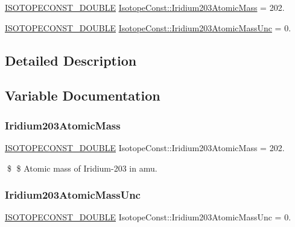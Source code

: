 \begin{DoxyCompactItemize}
\item 
\mbox{\hyperlink{group___isotope_const-_macros_ga8f45a7272ce02c0b4c65c44636ed719a}{I\+S\+O\+T\+O\+P\+E\+C\+O\+N\+S\+T\+\_\+\+D\+O\+U\+B\+LE}} \mbox{\hyperlink{group___isotope_const-_iridium-_ir203_gaf06bdb3d6808ec3d9e85cf89a5cb1a67}{Isotope\+Const\+::\+Iridium203\+Atomic\+Mass}} = 202.
\item 
\mbox{\hyperlink{group___isotope_const-_macros_ga8f45a7272ce02c0b4c65c44636ed719a}{I\+S\+O\+T\+O\+P\+E\+C\+O\+N\+S\+T\+\_\+\+D\+O\+U\+B\+LE}} \mbox{\hyperlink{group___isotope_const-_iridium-_ir203_ga0a6357fb4f5459d70a1bb34303ed77c2}{Isotope\+Const\+::\+Iridium203\+Atomic\+Mass\+Unc}} = 0.
\end{DoxyCompactItemize}


\subsection{Detailed Description}


\subsection{Variable Documentation}
\mbox{\label{group___isotope_const-_iridium-_ir203_gaf06bdb3d6808ec3d9e85cf89a5cb1a67}} 
\subsubsection{\texorpdfstring{Iridium203\+Atomic\+Mass}{Iridium203AtomicMass}}
{\footnotesize\ttfamily \mbox{\hyperlink{group___isotope_const-_macros_ga8f45a7272ce02c0b4c65c44636ed719a}{I\+S\+O\+T\+O\+P\+E\+C\+O\+N\+S\+T\+\_\+\+D\+O\+U\+B\+LE}} Isotope\+Const\+::\+Iridium203\+Atomic\+Mass = 202.}

\$ \$ Atomic mass of Iridium-\/203 in amu. \mbox{\label{group___isotope_const-_iridium-_ir203_ga0a6357fb4f5459d70a1bb34303ed77c2}} 
\subsubsection{\texorpdfstring{Iridium203\+Atomic\+Mass\+Unc}{Iridium203AtomicMassUnc}}
{\footnotesize\ttfamily \mbox{\hyperlink{group___isotope_const-_macros_ga8f45a7272ce02c0b4c65c44636ed719a}{I\+S\+O\+T\+O\+P\+E\+C\+O\+N\+S\+T\+\_\+\+D\+O\+U\+B\+LE}} Isotope\+Const\+::\+Iridium203\+Atomic\+Mass\+Unc = 0.}

